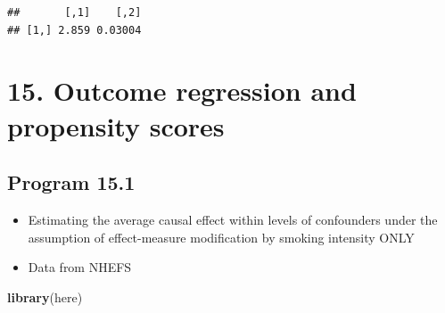 \documentclass[
  10pt,
]{book}
\newenvironment{Shaded}{\begin{snugshade}}{\end{snugshade}}
\newcommand{\KeywordTok}[1]{\textcolor[rgb]{0.13,0.29,0.53}{\textbf{#1}}}
\newcommand{\NormalTok}[1]{#1}
\providecommand{\tightlist}{%
  \setlength{\itemsep}{0pt}\setlength{\parskip}{0pt}}
\begin{document}
\begin{verbatim}
##       [,1]    [,2]
## [1,] 2.859 0.03004
\end{verbatim}

\hypertarget{outcome-regression-and-propensity-scores}{%
\chapter*{15. Outcome regression and propensity scores}\label{outcome-regression-and-propensity-scores}}

\hypertarget{program-15.1}{%
\section{Program 15.1}\label{program-15.1}}

\begin{itemize}
\tightlist
\item
  Estimating the average causal effect within levels of confounders under the assumption of effect-measure modification by smoking intensity ONLY
\item
  Data from NHEFS
\end{itemize}

\begin{Shaded}
\begin{Highlighting}[]
\KeywordTok{library}\NormalTok{(here)}
\end{Highlighting}
\end{Shaded}
\end{document}

